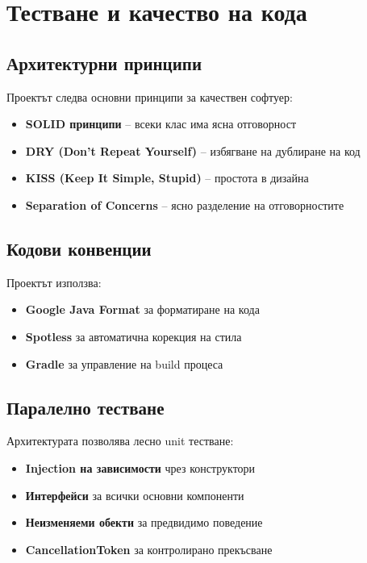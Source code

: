 \documentclass{article}
\begin{document}
\section{Тестване и качество на кода}

\subsection{Архитектурни принципи}

Проектът следва основни принципи за качествен софтуер:

\begin{itemize}
	\item \textbf{SOLID принципи} – всеки клас има ясна отговорност
	\item \textbf{DRY (Don't Repeat Yourself)} – избягване на дублиране на код
	\item \textbf{KISS (Keep It Simple, Stupid)} – простота в дизайна
	\item \textbf{Separation of Concerns} – ясно разделение на отговорностите
\end{itemize}

\subsection{Кодови конвенции}

Проектът използва:
\begin{itemize}
	\item \textbf{Google Java Format} за форматиране на кода
	\item \textbf{Spotless} за автоматична корекция на стила
	\item \textbf{Gradle} за управление на build процеса
\end{itemize}

\subsection{Паралелно тестване}

Архитектурата позволява лесно unit тестване:

\begin{itemize}
	\item \textbf{Injection на зависимости} чрез конструктори
	\item \textbf{Интерфейси} за всички основни компоненти
	\item \textbf{Неизменяеми обекти} за предвидимо поведение
	\item \textbf{CancellationToken} за контролирано прекъсване
\end{itemize}
\end{document}
